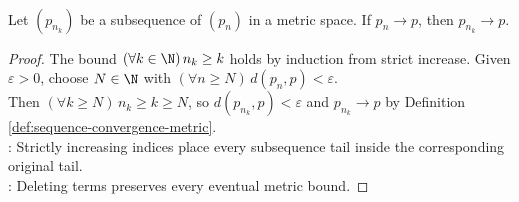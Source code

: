 \begin{corollary} \label{cor:metric-convergent-subsequences} \\
Let $(p_{n_k})$ be a subsequence of $(p_n)$ in a metric space. If $p_n\to p$, then $p_{n_k}\to p$.
\begin{proof}
The bound $(\forall k\in\N)\,n_k\geq k$ holds by induction from strict increase. Given $\varepsilon>0$, choose $N\in\N$ with $(\forall n\geq N)\,d(p_n,p)<\varepsilon$.\\
Then $(\forall k\geq N)\,n_k\geq k\geq N$, so $d(p_{n_k},p)<\varepsilon$ and $p_{n_k}\to p$ by Definition \ref{def:sequence-convergence-metric}.\\
: Strictly increasing indices place every subsequence tail inside the corresponding original tail.\\
: Deleting terms preserves every eventual metric bound.
\end{proof}
\end{corollary}

